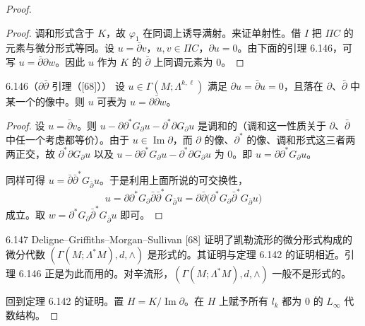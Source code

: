 \begin{proof}
  \begin{proof}
    调和形式含于 $K$，故 $\varphi_1$ 在同调上诱导满射。来证单射性。借 $I$ 把 $\Pi C$ 的元素与微分形式等同。设 $u=\bar\partial v$，$u,v\in\Pi C$，$\partial u=0$。由下面的引理 6.146，可写 $u=\bar\partial\partial w$。因此 $u$ 作为 $K$ 的 $\bar\partial$ 上同调元素为 0。
  \end{proof}

\begin{lemma*}{6.146（$\partial\bar\partial$ 引理（[68]））}
  设 $u\in\Gamma(M;\Lambda^{k,\ell})$ 满足 $\partial u=\bar\partial u=0$，且落在 $\partial$、$\bar\partial$ 中某一个的像中。则 $u$ 可表为 $u=\partial\bar\partial w$。
\end{lemma*}

\begin{proof}
  设 $u=\bar\partial v$。则 $u-\partial\partial^*G_\partial u-\partial^*\partial G_\partial u$ 是调和的（调和这一性质关于 $\partial$、$\bar\partial$ 中任一个考虑都等价）。由于 $u\in\operatorname{Im}\partial$，而 $\partial$ 的像、$\partial^*$ 的像、调和形式这三者两两正交，故 $\partial^*\partial G_\partial u$ 以及 $u-\partial\partial^*G_\partial u-\partial^*\partial G_\partial u$ 为 0。即 $u=\partial\partial^*G_\partial u$。

  同样可得 $u=\bar\partial\bar\partial^*G_{\bar\partial}u$。于是利用上面所说的可交换性，
  \[
    u=\partial\partial^*G_\partial\bar\partial\bar\partial^*G_{\bar\partial}u
    =\partial\bar\partial\bigl(\partial^*G_\partial\bar\partial^*G_{\bar\partial}u\bigr)
  \]
  成立。取 $w=\partial^*G_\partial\bar\partial^*G_{\bar\partial}u$ 即可。
\end{proof}


\begin{remark}{6.147}
  Deligne–Griffiths–Morgan–Sullivan [68] 证明了凯勒流形的微分形式构成的微分代数 $(\Gamma(M;\Lambda^*M),d,\wedge)$ 是形式的。其证明与定理 6.142 的证明相近。引理 6.146 正是为此而用的。对辛流形，$(\Gamma(M;\Lambda^*M),d,\wedge)$ 一般不是形式的。
\end{remark}

回到定理 6.142 的证明。置 $H=K/\operatorname{Im}\partial$。在 $H$ 上赋予所有 $l_k$ 都为 0 的 $L_{\infty}$ 代数结构。


\end{proof}
